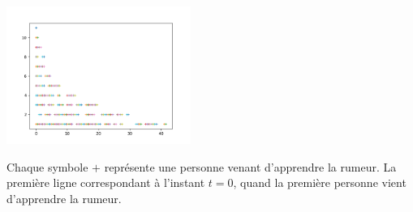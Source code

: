 \documentclass{exam}
\begin{document}
\begin{questions}
\begin{center}
\includegraphics[width=0.45\textwidth]{ModeleAleatoire4.png}
\end{center}
Chaque symbole $+$ représente une personne venant d'apprendre la rumeur. La première ligne correspondant à l'instant $t=0$, quand la première personne vient d'apprendre la rumeur. 
\end{questions}
\end{document}
